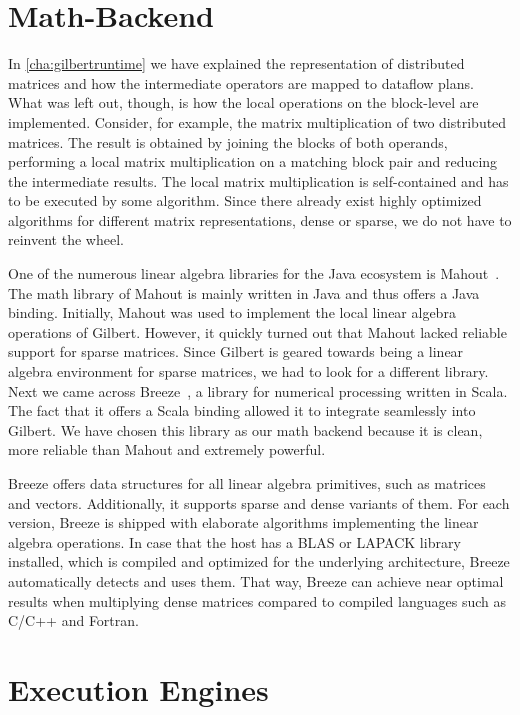 \section{Math-Backend}

In \cref{cha:gilbertruntime} we have explained the representation of distributed matrices and how the intermediate operators are mapped to dataflow plans.
What was left out, though, is how the local operations on the block-level are implemented.
Consider, for example, the matrix multiplication of two distributed matrices.
The result is obtained by joining the blocks of both operands, performing a local matrix multiplication on a matching block pair and reducing the intermediate results.
The local matrix multiplication is self-contained and has to be executed by some algorithm.
Since there already exist highly optimized algorithms for different matrix representations, dense or sparse, we do not have to reinvent the wheel.

One of the numerous linear algebra libraries for the Java ecosystem is Mahout~\cite{mahout:2011a}.
The math library of Mahout is mainly written in Java and thus offers a Java binding.
Initially, Mahout was used to implement the local linear algebra operations of Gilbert.
However, it quickly turned out that Mahout lacked reliable support for sparse matrices.
Since Gilbert is geared towards being a linear algebra environment for sparse matrices, we had to look for a different library.
Next we came across Breeze~\cite{breeze}, a library for numerical processing written in Scala.
The fact that it offers a Scala binding allowed it to integrate seamlessly into Gilbert.
We have chosen this library as our math backend because it is clean, more reliable than Mahout and extremely powerful.

Breeze offers data structures for all linear algebra primitives, such as matrices and vectors.
Additionally, it supports sparse and dense variants of them.
For each version, Breeze is shipped with elaborate algorithms implementing the linear algebra operations.
In case that the host has a BLAS or LAPACK library installed, which is compiled and optimized for the underlying architecture, Breeze automatically detects and uses them.
That way, Breeze can achieve near optimal results when multiplying dense matrices compared to compiled languages such as C/C++ and Fortran.

\section{Execution Engines}


